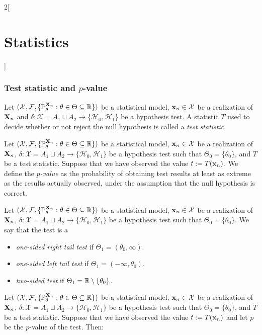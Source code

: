 \documentclass[../../../main_math.tex]{subfiles}
\begin{document}
\begin{multicols}{2}[\section{Statistics}]
  \subsubsection{Test statistic and \texorpdfstring{$p$}{p}-value}
  \begin{definition}
    Let $(\mathcal{X},\mathcal{F},\{\mathbb{P}_\theta^{\boldsymbol{\mathrm{X}}_n}:\theta\in\Theta\subseteq\mathbb{R}\})$ be a statistical model, $\boldsymbol{\mathrm{x}}_n\in\mathcal{X}$ be a realization of $\boldsymbol{\mathrm{X}}_n$ and $\delta:\mathcal{X}=A_1\sqcup A_2\rightarrow\{\mathcal{H}_0,\mathcal{H}_1\}$ be a hypothesis test. A statistic $T$ used to decide whether or not reject the null hypothesis is called a \emph{test statistic}.
  \end{definition}
  \begin{definition}
    Let $(\mathcal{X},\mathcal{F},\{\mathbb{P}_\theta^{\boldsymbol{\mathrm{X}}_n}:\theta\in\Theta\subseteq\mathbb{R}\})$ be a statistical model, $\boldsymbol{\mathrm{x}}_n\in\mathcal{X}$ be a realization of $\boldsymbol{\mathrm{X}}_n$, $\delta:\mathcal{X}=A_1\sqcup A_2\rightarrow\{\mathcal{H}_0,\mathcal{H}_1\}$ be a hypothesis test such that $\Theta_0=\{\theta_0\}$, and $T$ be a test statistic. Suppose that we have observed the value $t:=T(\boldsymbol{\mathrm{x}}_n)$. We define the \emph{$p$-value} as the probability of obtaining test results at least as extreme as the results actually observed, under the assumption that the null hypothesis is correct.
  \end{definition}
  \begin{definition}
    Let $(\mathcal{X},\mathcal{F},\{\mathbb{P}_\theta^{\boldsymbol{\mathrm{X}}_n}:\theta\in\Theta\subseteq\mathbb{R}\})$ be a statistical model, $\boldsymbol{\mathrm{x}}_n\in\mathcal{X}$ be a realization of $\boldsymbol{\mathrm{X}}_n$, $\delta:\mathcal{X}=A_1\sqcup A_2\rightarrow\{\mathcal{H}_0,\mathcal{H}_1\}$ be a hypothesis test such that $\Theta_0=\{\theta_0\}$. We say that the test is a
    \begin{itemize}
      \item \emph{one-sided right tail test} if $\Theta_1=(\theta_0,\infty)$.
      \item \emph{one-sided left tail test} if $\Theta_1=(-\infty,\theta_0)$.
      \item \emph{two-sided test} if $\Theta_1=\mathbb{R}\setminus\{\theta_0\}$.
    \end{itemize}
  \end{definition}
  \begin{proposition}
    Let $(\mathcal{X},\mathcal{F},\{\mathbb{P}_\theta^{\boldsymbol{\mathrm{X}}_n}:\theta\in\Theta\subseteq\mathbb{R}\})$ be a statistical model, $\boldsymbol{\mathrm{x}}_n\in\mathcal{X}$ be a realization of $\boldsymbol{\mathrm{X}}_n$, $\delta:\mathcal{X}=A_1\sqcup A_2\rightarrow\{\mathcal{H}_0,\mathcal{H}_1\}$ be a hypothesis test such that $\Theta_0=\{\theta_0\}$, and $T$ be a test statistic. Suppose that we have observed the value $t:=T(\boldsymbol{\mathrm{x}}_n)$ and let $p$ be the $p$-value of the test. Then:

\end{proposition}
\end{multicols}
\end{document}
